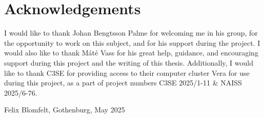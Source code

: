 \thispagestyle{plain}			%
\section*{Acknowledgements}

I would like to thank Johan Bengtsson Palme for welcoming me in his group, for the opportunity to work on this subject, and for his support during the project. 
I would also like to thank Máté Vass for his great help, guidance, and encouraging support during this project and the writing of this thesis. 
Additionally, I would like to thank C3SE for providing access to their computer cluster Vera for use during this project, as a part of project numbers C3SE 2025/1-11 \& NAISS 2025/6-76. 


\vspace{1.5cm}
\hfill
Felix Blomfelt, Gothenburg, May 2025

\newpage				%
\thispagestyle{empty}
\mbox{}
